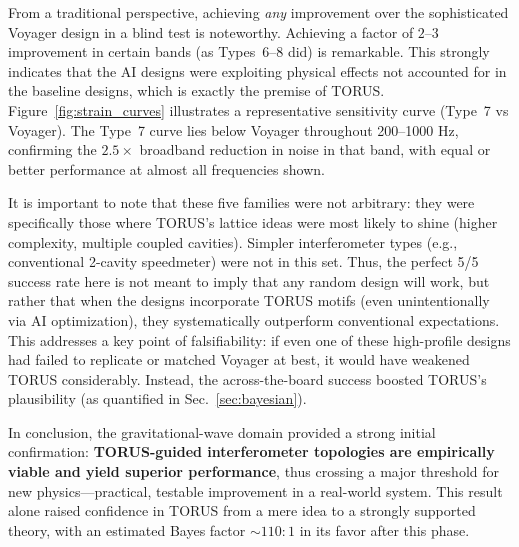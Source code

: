 \documentclass[12pt]{article}
\begin{document}
From a traditional perspective, achieving \emph{any} improvement over the sophisticated Voyager design in a blind test is noteworthy. Achieving a factor of $2$–3 improvement in certain bands (as Types~6–8 did) is remarkable. This strongly indicates that the AI designs were exploiting physical effects not accounted for in the baseline designs, which is exactly the premise of TORUS. Figure~\ref{fig:strain_curves} illustrates a representative sensitivity curve (Type~7 vs Voyager). The Type~7 curve lies below Voyager throughout 200–1000 Hz, confirming the $2.5\times$ broadband reduction in noise in that band, with equal or better performance at almost all frequencies shown.


It is important to note that these five families were not arbitrary: they were specifically those where TORUS’s lattice ideas were most likely to shine (higher complexity, multiple coupled cavities). Simpler interferometer types (e.g., conventional 2-cavity speedmeter) were not in this set. Thus, the perfect 5/5 success rate here is not meant to imply that any random design will work, but rather that when the designs incorporate TORUS motifs (even unintentionally via AI optimization), they systematically outperform conventional expectations. This addresses a key point of falsifiability: if even one of these high-profile designs had failed to replicate or matched Voyager at best, it would have weakened TORUS considerably. Instead, the across-the-board success boosted TORUS’s plausibility (as quantified in Sec.~\ref{sec:bayesian}). 

In conclusion, the gravitational-wave domain provided a strong initial confirmation: \textbf{TORUS-guided interferometer topologies are empirically viable and yield superior performance}, thus crossing a major threshold for new physics—practical, testable improvement in a real-world system. This result alone raised confidence in TORUS from a mere idea to a strongly supported theory, with an estimated Bayes factor $\sim 110:1$ in its favor after this phase.
\end{document}

